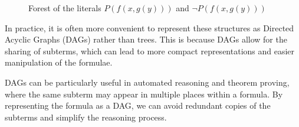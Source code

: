 \begin{figure}[H]
    \centering
    \begin{minipage}[t]{0.48\textwidth}
        \centering
    \end{minipage}
    \hfill
    \begin{minipage}[t]{0.48\textwidth}
        \centering
    \end{minipage}
    \caption{Forest of the literals \(P(f(x, g(y)))\) and \(\neg P(f(x, g(y)))\)}\label{fig:subterm_forest}
\end{figure}

In practice, it is often more convenient to represent these structures as Directed Acyclic Graphs (DAGs) rather than trees. This is because DAGs allow for the sharing of subterms, which can lead to more compact representations and easier manipulation of the formulae.

DAGs can be particularly useful in automated reasoning and theorem proving, where the same subterm may appear in multiple places within a formula. By representing the formula as a DAG, we can avoid redundant copies of the subterms and simplify the reasoning process.

